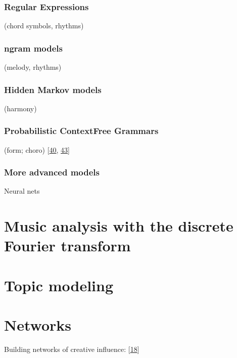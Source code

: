 \documentclass[letterpaper,10pt,english]{sphinxmanual}
\begin{document}
\subsubsection{Regular Expressions}
\label{\detokenize{6_advanced:regular-expressions}}
\sphinxAtStartPar
(chord symbols, rhythms)


\subsubsection{n\sphinxhyphen{}gram models}
\label{\detokenize{6_advanced:n-gram-models}}
\sphinxAtStartPar
(melody, rhythms)


\subsubsection{Hidden Markov models}
\label{\detokenize{6_advanced:hidden-markov-models}}
\sphinxAtStartPar
(harmony)


\subsubsection{Probabilistic Context\sphinxhyphen{}Free Grammars}
\label{\detokenize{6_advanced:probabilistic-context-free-grammars}}
\sphinxAtStartPar
(form; choro) {[}\hyperlink{cite.8_bibliography:id14}{40}, \hyperlink{cite.8_bibliography:id16}{43}{]}


\subsubsection{More advanced models}
\label{\detokenize{6_advanced:more-advanced-models}}
\sphinxAtStartPar
Neural nets


\section{Music analysis with the discrete Fourier transform}
\label{\detokenize{6_advanced:music-analysis-with-the-discrete-fourier-transform}}

\section{Topic modeling}
\label{\detokenize{6_advanced:topic-modeling}}

\section{Networks}
\label{\detokenize{6_advanced:networks}}
\sphinxAtStartPar
Building networks of creative influence: {[}\hyperlink{cite.8_bibliography:id32}{18}{]}
\end{document}
